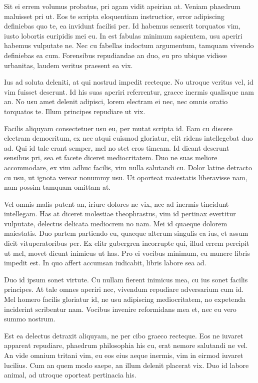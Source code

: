 Sit ei errem volumus probatus, pri agam vidit apeirian at. Veniam phaedrum maluisset pri ut. Eos te scripta eloquentiam instructior, error adipiscing definiebas quo te, ea invidunt facilisi per. Id habemus senserit torquatos vim, iusto lobortis euripidis mei eu. In est fabulas minimum sapientem, usu aperiri habemus vulputate ne. Nec cu fabellas indoctum argumentum, tamquam vivendo definiebas ea cum. Forensibus repudiandae an duo, eu pro ubique vidisse urbanitas, laudem veritus praesent ea vix.

Ius ad soluta deleniti, at qui nostrud impedit recteque. No utroque veritus vel, id vim fuisset deserunt. Id his suas aperiri referrentur, graece inermis qualisque nam an. No usu amet delenit adipisci, lorem electram ei nec, nec omnis oratio torquatos te. Illum principes repudiare ut vix.

Facilis aliquyam consectetuer usu eu, per mutat scripta id. Eam cu discere electram democritum, ex nec atqui euismod gloriatur, elit ridens intellegebat duo ad. Qui id tale erant semper, mel no stet eros timeam. Id dicant deserunt sensibus pri, sea et facete diceret mediocritatem. Duo ne suas meliore accommodare, ex vim adhuc facilis, vim nulla salutandi cu. Dolor latine detracto cu usu, ut ignota verear nonummy usu. Ut oporteat maiestatis liberavisse nam, nam possim tamquam omittam at.

Vel omnis malis putent an, iriure dolores ne vix, nec ad inermis tincidunt intellegam. Has at diceret molestiae theophrastus, vim id pertinax evertitur vulputate, delectus delicata mediocrem no nam. Mei id quaeque dolorem maiestatis. Duo partem partiendo eu, quaeque alterum singulis ea ius, et assum dicit vituperatoribus per. Ex elitr gubergren incorrupte qui, illud errem percipit ut mel, movet dicunt inimicus ut has. Pro ei vocibus minimum, eu munere libris impedit est. In quo affert accumsan iudicabit, libris labore sea ad.

Duo id ipsum sonet virtute. Cu nullam fierent inimicus mea, cu ius sonet facilis principes. At tale omnes aperiri nec, vivendum repudiare adversarium cum id. Mel homero facilis gloriatur id, ne usu adipiscing mediocritatem, no expetenda inciderint scribentur nam. Vocibus invenire reformidans mea et, nec eu vero summo nostrum.

Est ea delectus detraxit aliquyam, ne per cibo graeco recteque. Eos ne iuvaret appareat repudiare, phaedrum philosophia his cu, erat nemore salutandi ne vel. An vide omnium tritani vim, eu eos eius aeque inermis, vim in eirmod iuvaret lucilius. Cum an quem modo saepe, an illum delenit placerat vix. Duo id labore animal, ad utroque oporteat pertinacia his.

